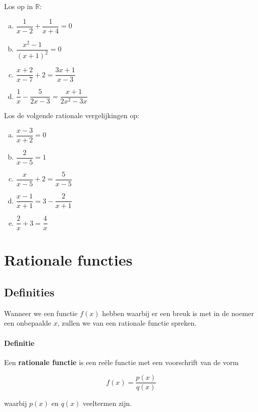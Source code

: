 \documentclass[12pt]{article}
\begin{document}
\begin{oefening}
Los op in $\mathbb{R}$:\\
\begin{enumerate}[(a)]
  \itemsep1em
  \item $\dfrac{1}{x-2}+\dfrac{1}{x+4}=0$
  \item $\dfrac{x^2-1}{(x+1)^2}=0$
  \item $\dfrac{x+2}{x-7}+2=\dfrac{3x+1}{x-3}$
  \item $\dfrac{1}{x}-\dfrac{5}{2x-3}=\dfrac{x+1}{2x^2-3x}$
\end{enumerate}
\end{oefening}

\begin{oefening}  %
Los de volgende rationale vergelijkingen op:
\begin{enumerate}[(a)]
  \itemsep1em
  \item $\dfrac{x-3}{x+2}=0$
  \item $\dfrac{2}{x-5}=1$
  \item $\dfrac{x}{x-5}+2=\dfrac{5}{x-5}$
  \item $\dfrac{x-1}{x+1}=3-\dfrac{2}{x+1}$
  \item $\dfrac{2}{x}+3=\dfrac{4}{x}$
\end{enumerate}
\end{oefening}

\section{Rationale functies}

\subsection{Definities}

Wanneer we een functie $f(x)$ hebben waarbij er een breuk is met in de noemer een onbepaalde $x$, zullen we van een rationale functie spreken.

\paragraph*{Definitie}
\begin{mdframed}
Een {\bf rationale functie} is een reële functie met een voorschrift van de vorm

$$f(x)=\dfrac{p(x)}{q(x)}$$

waarbij $p(x)$ en $q(x)$ veeltermen zijn.
\end{mdframed}
\end{document}

